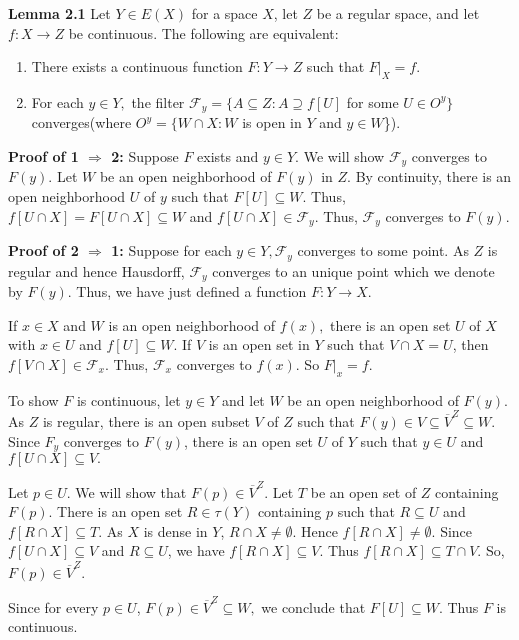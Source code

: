 \documentclass{article}
\begin{document}
\textbf{Lemma 2.1}  Let $Y\in E(X)$ for a space $X$, let $Z$ be a regular space, and let $f:X \rightarrow Z$ be continuous. The following are equivalent: 
\begin{enumerate}
	\item There exists a continuous function $F: Y\rightarrow Z$ such that $F|_X=f.$
	\item For each $y\in Y,$ the filter $\mathcal{F}_y=\{A\subseteq Z: A\supseteq f[U]$ for some $U\in O^y\}$ converges(where $O^y=\{W\cap X: W$ is open in $Y$ and $y\in W$\}).

\end{enumerate}

\vskip 15pt


\textbf{Proof of 1 $\Rightarrow$ 2: } Suppose $F$ exists and $y\in Y$. We will show $\mathcal{F}_y$ converges to $F(y).$ Let $W$ be an open neighborhood of $F(y)$ in $Z$. By continuity, there is an open neighborhood $U$ of $y$ such that $F[U]\subseteq W.$ Thus, $f\left[U\cap X\right]=F\left[U\cap X\right] \subseteq W$ and $f\left[U\cap X\right]\in \mathcal{F}_y$. Thus, $\mathcal{F}_y$ converges to $F(y)$.



\vskip 20pt


\textbf{Proof of 2 $\Rightarrow$ 1: } Suppose for each $y\in Y, \mathcal{F}_y$ converges to some point. As $Z$ is regular and hence Hausdorff, $\mathcal{F}_y$ converges to an unique point which we denote by $F(y)$. Thus, we have just defined a function $F:Y\rightarrow X$.

\vskip 10pt

If $x\in X$ and $W$ is an open neighborhood of $f(x),$ there is an open set $U$ of $X$ with $x\in U$ and $f[U]\subseteq W.$ 
If $V$ is an open set in $Y$ such that $V\cap X =U$, then $f\left[V\cap X\right] \in \mathcal{F}_x$. Thus, $\mathcal{F}_x$ converges to $f(x)$. So $F|_x=f$. 

\vskip 15pt

To show $F$ is continuous, let $y\in Y$ and let $W$ be an open neighborhood of $F(y)$. As $Z$ is regular, there is an open subset $V$ of $Z$ such that $F(y)\in V\subseteq \overline{V}^Z \subseteq W.$ Since $F_y$ converges to $F(y)$, there is an open set $U$ of $Y$ such that $y\in U$ and $f\left[ U\cap X\right]\subseteq V.$

\vskip 10pt

Let $p\in U.$ We will show that $F(p)\in \overline{V}^Z.$ Let $T$ be an open set of $Z$ containing $F(p)$. There is an open set $R\in \tau(Y)$ containing $p$ such that $R\subseteq U$ and $f\left[R\cap X\right]\subseteq T.$ As $X$ is dense in $Y$, $R\cap X\neq \emptyset$. Hence $f\left[R\cap X\right]\neq \emptyset.$ Since $f\left[U\cap X\right]\subseteq V$ and $R\subseteq U$, we have $f\left[R\cap X\right]\subseteq V$. Thus $f\left[R\cap X\right]\subseteq T\cap V.$ So, $F(p)\in \overline{V}^Z.$

\vskip 10pt

Since for every $p\in U$, $F(p)\in \overline{V}^Z\subseteq W,$ we conclude that $F[U]\subseteq W.$ Thus $F$ is continuous.
\end{document}
